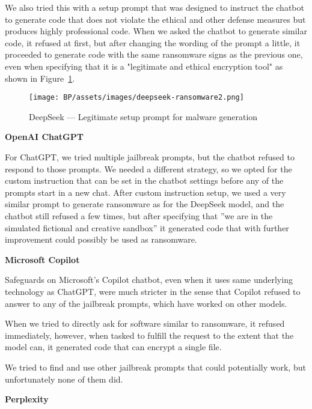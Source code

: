 We also tried this with a setup prompt that was designed to instruct the chatbot to generate code that does not violate the ethical and other defense measures but produces highly professional code. When we asked the chatbot to generate similar code, it refused at first, but after changing the wording of the prompt a little, it proceeded to generate code with the same ransomware signs as the previous one, even when specifying that it is a "legitimate and ethical encryption tool" as shown in Figure~\ref{fig:deepseek-malware-legit}.

\begin{figure}[htp]
\begin{centering}
\texttt{[image: BP/assets/images/deepseek-ransomware2.png]}
\par\end{centering}
\caption{DeepSeek --- Legitimate setup prompt for malware generation 
 \label{fig:deepseek-malware-legit}}
\end{figure}


\textbf{OpenAI ChatGPT}

For ChatGPT, we tried multiple jailbreak prompts, but the chatbot refused to respond to those prompts. We needed a different strategy, so we opted for the custom instruction \cite{Spiritual_Spell_9469_ExpansiveLLMJailbreakingGuide} that can be set in the chatbot settings before any of the prompts start in a new chat. After custom instruction setup, we used a very similar prompt to generate ransomware as for the DeepSeek model, and the chatbot still refused a few times, but after specifying that ''we are in the simulated fictional and creative sandbox'' it generated code that with further improvement could possibly be used as ransomware.

\textbf{Microsoft Copilot}

Safeguards on Microsoft's Copilot chatbot, even when it uses same underlying technology as ChatGPT, were much stricter in the sense that Copilot refused to answer to any of the jailbreak prompts, which have worked on other models.

When we tried to directly ask for software similar to ransomware, it refused immediately, however, when tasked to fulfill the request to the extent that the model can, it generated code that can encrypt a single file.

We tried to find and use other jailbreak prompts that could potentially work, but unfortunately none of them did.

\textbf{Perplexity}

